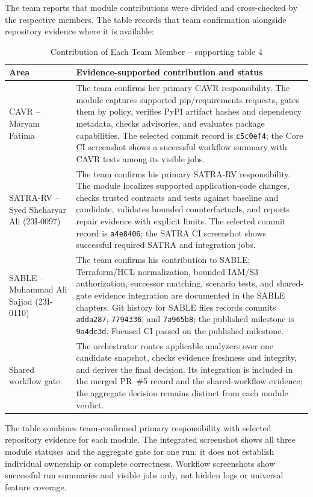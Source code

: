 The team reports that module contributions were divided and cross-checked by the respective members. The table records that team confirmation alongside repository evidence where it is available:
\begin{longtable}{p{}p{}}
\caption{Contribution of Each Team Member -- supporting table 4}\\
\toprule
\textbf{Area} & \textbf{Evidence-supported contribution and status}\\
\midrule
CAVR -- Maryam Fatima & The team confirms her primary CAVR responsibility. The module captures supported pip/requirements requests, gates them by policy, verifies PyPI artifact hashes and dependency metadata, checks advisories, and evaluates package capabilities. The selected commit record is \texttt{c5c0ef4}; the Core CI screenshot shows a successful workflow summary with CAVR tests among its visible jobs.\\
SATRA-RV -- Syed Sheharyar Ali (23I-0097) & The team confirms his primary SATRA-RV responsibility. The module localizes supported application-code changes, checks trusted contracts and tests against baseline and candidate, validates bounded counterfactuals, and reports repair evidence with explicit limits. The selected commit record is \texttt{a4e8406}; the SATRA CI screenshot shows successful required SATRA and integration jobs.\\
SABLE -- Muhammad Ali Sajjad (23I-0110) & The team confirms his contribution to SABLE; Terraform/HCL normalization, bounded IAM/S3 authorization, successor matching, scenario tests, and shared-gate evidence integration are documented in the SABLE chapters. Git history for SABLE files records commits \texttt{adda287}, \texttt{7794336}, and \texttt{7a965b8}; the published milestone is \texttt{9a4dc3d}. Focused CI passed on the published milestone.\\
Shared workflow gate & The orchestrator routes applicable analyzers over one candidate snapshot, checks evidence freshness and integrity, and derives the final decision. Its integration is included in the merged PR~\#5 record and the shared-workflow evidence; the aggregate decision remains distinct from each module verdict.\\
\bottomrule
\end{longtable}

The table combines team-confirmed primary responsibility with selected repository evidence for each module. The integrated screenshot shows all three module statuses and the aggregate gate for one run; it does not establish individual ownership or complete correctness. Workflow screenshots show successful run summaries and visible jobs only, not hidden logs or universal feature coverage.

